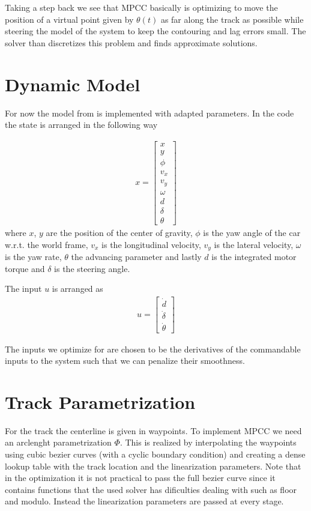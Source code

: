 \documentclass[12pt]{article}
\begin{document}
Taking a step back we see that MPCC basically is optimizing to move the position of a virtual point given by $\theta(t)$ as far along the track as possible while steering the model of the system to keep the contouring and lag errors small. The solver than discretizes this problem and finds approximate solutions.
\section{Dynamic Model}

For now the model from \cite{liniger2015optimization} is implemented with adapted parameters. In the code the state is arranged in the following way

\begin{align}
x = \begin{bmatrix}
x\\
y\\
\phi\\
v_x\\
v_y\\
\omega\\
d\\
\delta\\
\theta
\end{bmatrix}
\end{align}
where $x$, $y$ are the position of the center of gravity, $\phi$ is the yaw angle of the car w.r.t. the world frame, $v_x$ is the longitudinal velocity, $v_y$ is the lateral velocity, $\omega$ is the yaw rate, $\theta$ the advancing parameter and lastly $d$ is the integrated motor torque and $\delta$ is the steering angle.

The input $u$ is arranged as
\begin{align}
u = \begin{bmatrix}
\dot{d}\\
\dot\delta\\
\dot\theta
\end{bmatrix}
\end{align} 

The inputs we optimize for are chosen to be the derivatives of the commandable inputs to the system such that we can penalize their smoothness.

\section{Track Parametrization}

For the track the centerline is given in waypoints. To implement MPCC we need an arclenght parametrization $\Phi$. This is realized by interpolating the waypoints using cubic bezier curves (with a cyclic boundary condition) and creating a dense lookup table with the track location and the linearization parameters. Note that in the optimization it is not practical to pass the  full bezier curve since it contains functions that the used solver has dificulties dealing with such as floor and modulo. Instead the linearization parameters are passed at every stage.   




\end{document}
